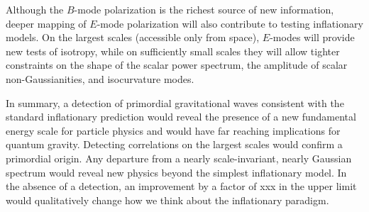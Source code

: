 Although the $B$-mode polarization is the richest source of new information, deeper mapping of $E$-mode polarization will also contribute to testing inflationary models. On the largest scales (accessible only from space), $E$-modes will provide new tests of isotropy, while on sufficiently small scales they will allow tighter constraints on the shape of the scalar power spectrum, the amplitude of scalar non-Gaussianities, and isocurvature modes.  

In summary, a detection of primordial gravitational waves consistent with the standard inflationary prediction would reveal the presence of a new fundamental energy scale for particle physics and would have far reaching implications for quantum gravity. Detecting correlations on the largest scales would confirm a primordial origin. Any departure from a nearly scale-invariant, nearly Gaussian spectrum would reveal new physics beyond the simplest inflationary model. In the absence of a detection, an improvement by a factor of xxx in the upper limit would qualitatively change how we think about the inflationary paradigm.

% 
%
 
